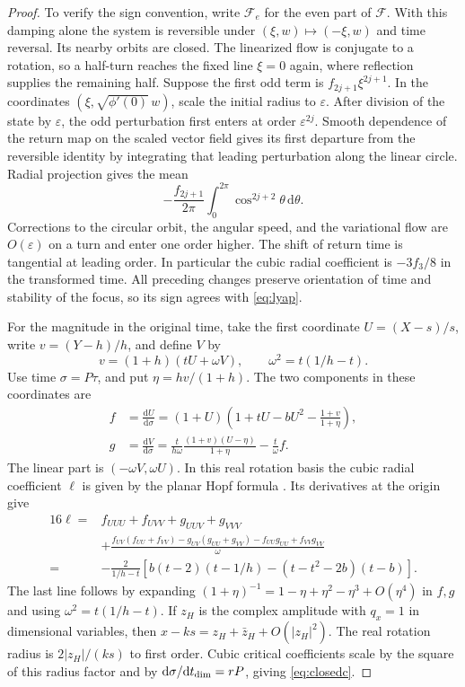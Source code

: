 \documentclass[12pt,a4paper,twoside,fleqn]{article}
\theoremstyle{journal}
\newcommand{\dd}{\mathrm{d}}
\begin{document}
\begin{proof}
To verify the sign convention, write \(\mathcal F_e\) for the even part of \(\mathcal F\). With this damping alone the system is reversible under \((\xi,w)\mapsto(-\xi,w)\) and time reversal. Its nearby orbits are closed. The linearized flow is conjugate to a rotation, so a half-turn reaches the fixed line \(\xi=0\) again, where reflection supplies the remaining half. Suppose the first odd term is \(f_{2j+1}\xi^{2j+1}\). In the coordinates \((\xi,\sqrt{\phi'(0)}\,w)\), scale the initial radius to \(\varepsilon\). After division of the state by \(\varepsilon\), the odd perturbation first enters at order \(\varepsilon^{2j}\). Smooth dependence of the return map on the scaled vector field gives its first departure from the reversible identity by integrating that leading perturbation along the linear circle. Radial projection gives the mean
\[
 -\frac{f_{2j+1}}{2\pi}\int_0^{2\pi}\cos^{2j+2}\theta\,\dd\theta .
\]
Corrections to the circular orbit, the angular speed, and the variational flow are \(O(\varepsilon)\) on a turn and enter one order higher. The shift of return time is tangential at leading order. In particular the cubic radial coefficient is \(-3f_3/8\) in the transformed time. All preceding changes preserve orientation of time and stability of the focus, so its sign agrees with \eqref{eq:lyap}.

For the magnitude in the original time, take the first coordinate \(U=(X-s)/s\), write \(v=(Y-h)/h\), and define \(V\) by
\[
 v=(1+h)(tU+\omega V),\qquad \omega^2=t(1/h-t).
\]
Use time \(\sigma=P\tau\), and put \(\eta=hv/(1+h)\). The two components in these coordinates are
\[
 \begin{aligned}
 f&=\frac{\dd U}{\dd\sigma}
    =(1+U)\left(1+tU-bU^2-\frac{1+v}{1+\eta}\right),\\
 g&=\frac{\dd V}{\dd\sigma}
    =\frac{t}{h\omega}\frac{(1+v)(U-\eta)}{1+\eta}-\frac{t}{\omega}f .
 \end{aligned}
\]
The linear part is \((-\omega V,\omega U)\). In this real rotation basis the cubic radial coefficient \(\ell\) is given by the planar Hopf formula \citep{kuzhopf}. Its derivatives at the origin give
\[
 \begin{aligned}
 16\ell={}& f_{UUU}+f_{UVV}+g_{UUV}+g_{VVV}\\
 &+\frac{f_{UV}(f_{UU}+f_{VV})-g_{UV}(g_{UU}+g_{VV})
             -f_{UU}g_{UU}+f_{VV}g_{VV}}{\omega}\\
 ={}&-\frac{2}{1/h-t}
     \left[b(t-2)(t-1/h)-(t-t^2-2b)(t-b)\right].
 \end{aligned}
\]
The last line follows by expanding \((1+\eta)^{-1}=1-\eta+\eta^2-\eta^3+O(\eta^4)\) in \(f,g\) and using \(\omega^2=t(1/h-t)\). If \(z_H\) is the complex amplitude with \(q_x=1\) in dimensional variables, then \(x-ks=z_H+\bar z_H+O(|z_H|^2)\). The real rotation radius is \(2|z_H|/(ks)\) to first order. Cubic critical coefficients scale by the square of this radius factor and by \(\dd\sigma/\dd t_{\rm dim}=rP\), giving \eqref{eq:closedc}.


\end{proof}
\end{document}
